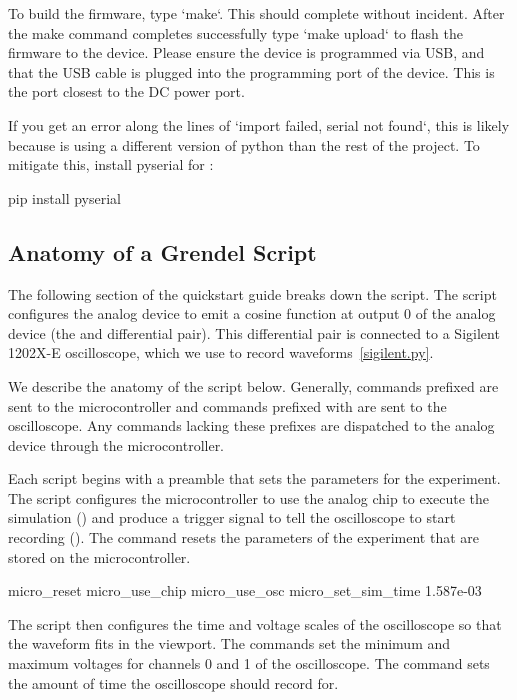 To build the firmware, type `make`. This should complete without incident. After the make command completes 
successfully type `make upload` to flash the firmware to the device. Please ensure the device is programmed via USB,
and that the USB cable is plugged into the programming port of the device. This is the port closest to the DC power port. 

If you get an error along the lines of `import failed, serial not found`, this is likely because  is using 
a different version of python than the rest of the project. To mitigate this, install pyserial for :

\begin{snippet}
pip install pyserial
\end{snippet}

\subsection{Anatomy of a Grendel Script}

The following section of the quickstart guide breaks down the 
 script. The 
script configures the analog device to emit a
cosine function at output 0 of the analog device (the  and 
differential pair). This differential pair is connected to a Sigilent 1202X-E
oscilloscope, which we use to record waveforms~\ref{sigilent.py}.

We describe the anatomy of the \grendel script below. Generally, commands
prefixed  are sent to the microcontroller and commands prefixed with
 are sent to the oscilloscope. Any commands lacking these prefixes are
dispatched to the analog device through the microcontroller.


Each \grendel script begins with a preamble that sets the parameters for the
experiment. The  script configures the microcontroller to use the
analog chip to execute the simulation () and produce a
trigger signal to tell the oscilloscope to start recording (). The 
command resets the parameters of the experiment that are stored on the
microcontroller.

\begin{snippet}
micro_reset
micro_use_chip
micro_use_osc
micro_set_sim_time 1.587e-03
\end{snippet}

The \grendel script then configures the time and voltage scales of the
oscilloscope so that the waveform fits in the viewport. The 
commands set the minimum and maximum voltages for channels 0 and 1 of the
oscilloscope. The  command sets the amount of time the
oscilloscope should record for.

